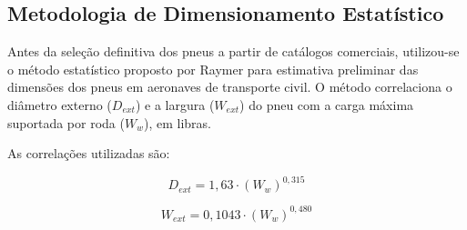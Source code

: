\begin{table}[H]
    \centering
    \caption{Condições de carregamento do trem de pouso.}
    \vspace{0.2cm}


    \label{tab:carregamento}
\end{table}


\subsection{Metodologia de Dimensionamento Estatístico}

Antes da seleção definitiva dos pneus a partir de catálogos comerciais, utilizou-se o método estatístico proposto por Raymer \cite{raymer2018} para estimativa preliminar das dimensões dos pneus em aeronaves de transporte civil. O método correlaciona o diâmetro externo ($D_{ext}$) e a largura ($W_{ext}$) do pneu com a carga máxima suportada por roda ($W_w$), em libras.

As correlações utilizadas são:

\begin{equation}
D_{ext} = 1,63 \cdot \left(W_w\right)^{0,315}
\end{equation}

\begin{equation}
W_{ext} = 0,1043 \cdot \left(W_w\right)^{0,480}
\end{equation}

